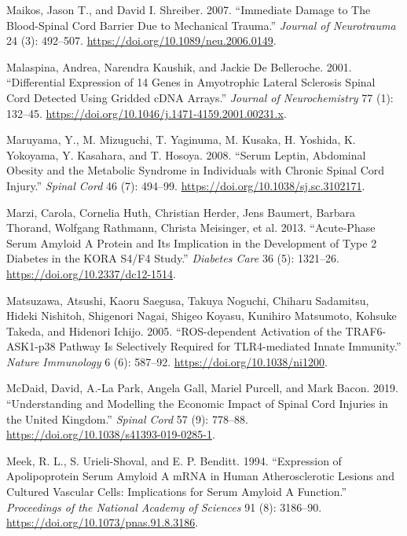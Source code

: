 \documentclass[9pt,lineno]{elife}
\newlength{\cslhangindent}
\newlength{\cslentryspacingunit} %
\newenvironment{CSLReferences}[2] %
 {%
  \setlength{\parindent}{0pt}
  \ifodd #1
  \let\oldpar\par
  \def\par{\hangindent=\cslhangindent\oldpar}
  \fi
  \setlength{\parskip}{#2\cslentryspacingunit}
 }%
 {}
\begin{document}
\begin{CSLReferences}{1}{0}
\leavevmode{}%
Maikos, Jason T., and David I. Shreiber. 2007. {``Immediate {Damage} to {The Blood-Spinal Cord Barrier Due} to {Mechanical Trauma}.''} \emph{Journal of Neurotrauma} 24 (3): 492--507. \url{https://doi.org/10.1089/neu.2006.0149}.

\leavevmode{}%
Malaspina, Andrea, Narendra Kaushik, and Jackie De Belleroche. 2001. {``Differential Expression of 14 Genes in Amyotrophic Lateral Sclerosis Spinal Cord Detected Using Gridded {cDNA} Arrays.''} \emph{Journal of Neurochemistry} 77 (1): 132--45. \url{https://doi.org/10.1046/j.1471-4159.2001.00231.x}.

\leavevmode{}%
Maruyama, Y., M. Mizuguchi, T. Yaginuma, M. Kusaka, H. Yoshida, K. Yokoyama, Y. Kasahara, and T. Hosoya. 2008. {``Serum Leptin, Abdominal Obesity and the Metabolic Syndrome in Individuals with Chronic Spinal Cord Injury.''} \emph{Spinal Cord} 46 (7): 494--99. \url{https://doi.org/10.1038/sj.sc.3102171}.

\leavevmode{}%
Marzi, Carola, Cornelia Huth, Christian Herder, Jens Baumert, Barbara Thorand, Wolfgang Rathmann, Christa Meisinger, et al. 2013. {``Acute-{Phase Serum Amyloid A Protein} and {Its Implication} in the {Development} of {Type} 2 {Diabetes} in the {KORA S4}/{F4 Study}.''} \emph{Diabetes Care} 36 (5): 1321--26. \url{https://doi.org/10.2337/dc12-1514}.

\leavevmode{}%
Matsuzawa, Atsushi, Kaoru Saegusa, Takuya Noguchi, Chiharu Sadamitsu, Hideki Nishitoh, Shigenori Nagai, Shigeo Koyasu, Kunihiro Matsumoto, Kohsuke Takeda, and Hidenori Ichijo. 2005. {``{ROS-dependent} Activation of the {TRAF6-ASK1-p38} Pathway Is Selectively Required for {TLR4-mediated} Innate Immunity.''} \emph{Nature Immunology} 6 (6): 587--92. \url{https://doi.org/10.1038/ni1200}.

\leavevmode{}%
McDaid, David, A.-La Park, Angela Gall, Mariel Purcell, and Mark Bacon. 2019. {``Understanding and Modelling the Economic Impact of Spinal Cord Injuries in the {United Kingdom}.''} \emph{Spinal Cord} 57 (9): 778--88. \url{https://doi.org/10.1038/s41393-019-0285-1}.

\leavevmode{}%
Meek, R. L., S. Urieli-Shoval, and E. P. Benditt. 1994. {``Expression of Apolipoprotein Serum Amyloid {A mRNA} in Human Atherosclerotic Lesions and Cultured Vascular Cells: Implications for Serum Amyloid {A} Function.''} \emph{Proceedings of the National Academy of Sciences} 91 (8): 3186--90. \url{https://doi.org/10.1073/pnas.91.8.3186}.


\end{CSLReferences}
\end{document}
